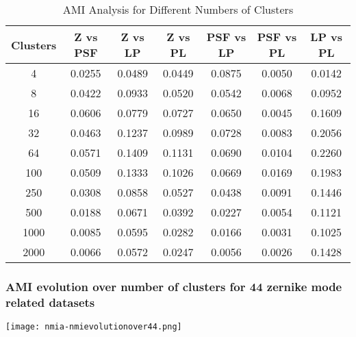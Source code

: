 \begin{table}[h!]
\centering
\begin{tabular}{|c|c|c|c|c|c|c|}
\hline
\textbf{Clusters} & \textbf{Z vs PSF} & \textbf{Z vs LP} & \textbf{Z vs PL} & \textbf{PSF vs LP} & \textbf{PSF vs PL} & \textbf{LP vs PL} \\
\hline
4    & 0.0255 & 0.0489 & 0.0449 & 0.0875 & 0.0050 & 0.0142 \\ 
8    & 0.0422 & 0.0933 & 0.0520 & 0.0542 & 0.0068 & 0.0952 \\ 
16   & 0.0606 & 0.0779 & 0.0727 & 0.0650 & 0.0045 & 0.1609 \\ 
32   & 0.0463 & 0.1237 & 0.0989 & 0.0728 & 0.0083 & 0.2056 \\ 
64   & 0.0571 & 0.1409 & 0.1131 & 0.0690 & 0.0104 & 0.2260 \\ 
100  & 0.0509 & 0.1333 & 0.1026 & 0.0669 & 0.0169 & 0.1983 \\ 
250  & 0.0308 & 0.0858 & 0.0527 & 0.0438 & 0.0091 & 0.1446 \\ 
500  & 0.0188 & 0.0671 & 0.0392 & 0.0227 & 0.0054 & 0.1121 \\ 
1000 & 0.0085 & 0.0595 & 0.0282 & 0.0166 & 0.0031 & 0.1025 \\ 
2000 & 0.0066 & 0.0572 & 0.0247 & 0.0056 & 0.0026 & 0.1428 \\ 
\hline
\end{tabular}
\caption{AMI Analysis for Different Numbers of Clusters}
\end{table}
		\FloatBarrier
		
		
	\subsubsection{AMI evolution over number of clusters for 44 zernike mode related datasets}
		\begin{figure*}[ht!]
			\centering
			\texttt{[image: nmia-nmievolutionover44.png]}
		\end{figure*}
		
